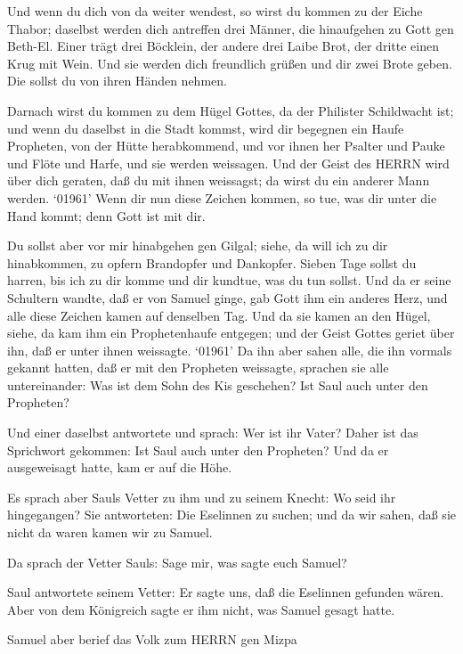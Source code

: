  Und wenn du dich von da weiter wendest, so wirst du kommen
zu der Eiche Thabor; daselbst werden dich antreffen drei Männer, die
hinaufgehen zu Gott gen Beth-El. Einer trägt drei Böcklein, der andere
drei Laibe Brot, der dritte einen Krug mit Wein.  Und sie
werden dich freundlich grüßen und dir zwei Brote geben. Die sollst du
von ihren Händen nehmen.

 Darnach wirst du kommen zu dem Hügel Gottes, da der
Philister Schildwacht ist; und wenn du daselbst in die Stadt kommst,
wird dir begegnen ein Haufe Propheten, von der Hütte herabkommend, und
vor ihnen her Psalter und Pauke und Flöte und Harfe, und sie werden
weissagen.  Und der Geist des HERRN wird über dich geraten,
daß du mit ihnen weissagst; da wirst du ein anderer Mann werden.
 `01961' Wenn dir nun diese Zeichen kommen, so tue, was dir
unter die Hand kommt; denn Gott ist mit dir.

 Du sollst aber vor mir hinabgehen gen Gilgal; siehe, da
will ich zu dir hinabkommen, zu opfern Brandopfer und Dankopfer. Sieben
Tage sollst du harren, bis ich zu dir komme und dir kundtue, was du tun
sollst.  Und da er seine Schultern wandte, daß er von Samuel
ginge, gab Gott ihm ein anderes Herz, und alle diese Zeichen kamen auf
denselben Tag.  Und da sie kamen an den Hügel, siehe, da
kam ihm ein Prophetenhaufe entgegen; und der Geist Gottes geriet über
ihn, daß er unter ihnen weissagte.  `01961' Da ihn aber
sahen alle, die ihn vormals gekannt hatten, daß er mit den Propheten
weissagte, sprachen sie alle untereinander: Was ist dem Sohn des Kis
geschehen? Ist Saul auch unter den Propheten?

 Und einer daselbst antwortete und sprach: Wer ist ihr
Vater? Daher ist das Sprichwort gekommen: Ist Saul auch unter den
Propheten?  Und da er ausgeweisagt hatte, kam er auf die
Höhe.

 Es sprach aber Sauls Vetter zu ihm und zu seinem Knecht:
Wo seid ihr hingegangen? Sie antworteten: Die Eselinnen zu suchen; und
da wir sahen, daß sie nicht da waren kamen wir zu Samuel.

 Da sprach der Vetter Sauls: Sage mir, was sagte euch
Samuel?

 Saul antwortete seinem Vetter: Er sagte uns, daß die
Eselinnen gefunden wären. Aber von dem Königreich sagte er ihm nicht,
was Samuel gesagt hatte.

 Samuel aber berief das Volk zum HERRN gen Mizpa


